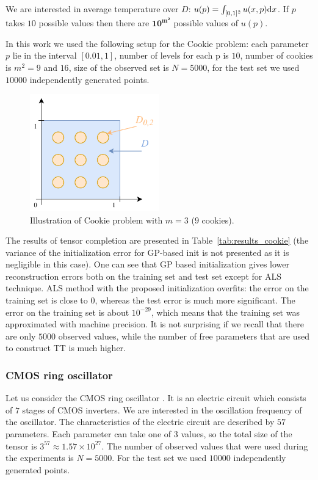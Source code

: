 We are interested in average temperature over $D$:
$u(p) = \int_{[0, 1]^2} u(x, p){\rm d}x$.
If $p$ takes $10$ possible values then there are $\mathbf{10^{m^2}}$
possible values of $u(p)$.

In this work we used the following setup for the Cookie problem: each parameter $p$ lie in the interval
$[0.01, 1]$,
number of levels for each p is $10$,
number of cookies is $m^2 = 9$ and $16$,
size of the observed set is $N = 5000$,
for the test set we used $10000$ independently generated points.

\begin{figure}[htbp]
  \centering
  \includegraphics[width=0.5\textwidth]{figures/tensor_completion/CookieProblem.pdf}
  \caption{Illustration of Cookie problem with $m=3$ ($9$ cookies).}
  \label{fig:cookie_problem}
\end{figure}

The results of tensor completion are presented in Table~\ref{tab:results_cookie} (the variance of the initialization error for GP-based init is not presented as it is negligible in this case). One can see that GP based initialization gives lower reconstruction errors both on the training set and test set except for ALS technique. ALS method with the proposed initialization
overfits: the error on the training set is close to $0$, whereas the test error is much more significant. The error on the training set is about $10^{-29}$, which means that the training set was approximated with machine precision.
It is not surprising if we recall that there are only $5000$ observed values, while the number of free parameters that are used to construct TT is much higher.

\subsubsection{CMOS ring oscillator}
\label{sec:cmos_ring_oscillator}
Let us consider the CMOS ring oscillator \citep{zhang2017big}. It is an electric circuit which consists of $7$ stages of CMOS inverters.
We are interested in the oscillation frequency of the oscillator. The characteristics of the electric circuit are described by $57$ parameters.
Each parameter can take one of $3$ values, so the total size of the tensor is $3^{57} \approx 1.57 \times 10^{27}$. The number of observed values that were used during the experiments is $N = 5000$. For the test set we used $10000$ independently generated points.

